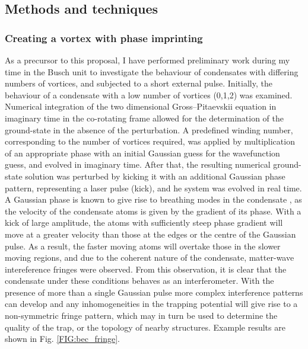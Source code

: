 \subsection{Methods and techniques}
\subsubsection{Creating a vortex with phase imprinting}
As a precursor to this proposal, I have performed preliminary work during my time in the Busch unit to investigate the behaviour of condensates with differing numbers of
vortices, and subjected to a short external pulse. Initially, the behaviour of a condensate with a low number of vortices (0,1,2) was examined. 
Numerical integration of the two dimensional Gross--Pitaevskii equation in imaginary time in the co-rotating frame allowed for the
determination of the ground-state in the absence of the perturbation. A predefined winding number, corresponding to the number of vortices required, was applied by multiplication of an appropriate phase with an initial Gaussian guess for the wavefunction guess, and evolved in imaginary time. After that, the resulting numerical ground-state solution was perturbed by kicking it with an additional Gaussian phase pattern, representing a laser pulse (kick), and he system was evolved in real time. A Gaussian phase is
known to give rise to breathing modes in the condensate \cite{BEC:Kimura_pra_2002}, as the velocity of the condensate atoms is given by the 
gradient of its phase. With a kick of large amplitude, the atoms with sufficiently steep phase gradient will move at a greater velocity than those at the
edges or the centre of the Gaussian pulse. As a result, the faster moving atoms will overtake those in the slower moving regions, and due to the
coherent nature of the condensate, matter-wave intereference fringes were observed. From this observation, it is clear that the condensate
under these conditions behaves as an interferometer. With the presence of more than a single Gaussian pulse more complex interference 
patterns can develop and any inhomogeneities in the trapping potential will give rise to a non-symmetric fringe pattern, which may in turn be used to determine the quality of the trap, or the topology of nearby structures. Example results are shown in Fig. \ref{FIG:bec_fringe}.
